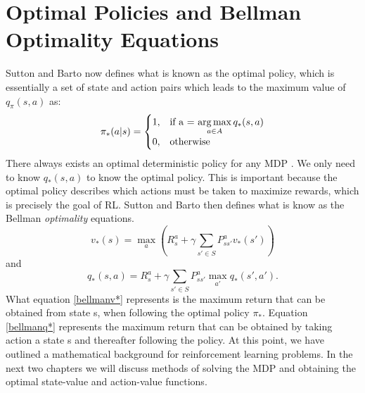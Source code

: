 \section{Optimal Policies and Bellman Optimality Equations}
Sutton and Barto now defines what is known as the optimal policy, which is essentially a set of state and action pairs which leads to the maximum value of $q_\pi(s,a)$ as:
\begin{align}
	\pi_{*}(a|s)=\begin{cases}
		1, & \text{if a = $\operatorname*{arg\,max}\limits_{a \in A}q_* (s,a)$}\\
		0, & \text{otherwise}
	\end{cases}
	\label{eq:pi_*}
\end{align}
There always exists an optimal deterministic policy for any MDP \cite{sutton_barto}. We only need to know $q_* (s,a)$ to know the optimal policy. This is important because the optimal policy describes which actions must be taken to maximize rewards, which is precisely the goal of RL.
Sutton and Barto \cite{sutton_barto} then defines what is know as the Bellman \textit{optimality} equations.
\begin{equation}
	v_*(s) = \max\limits_{a}(R^{a}_s+\gamma\sum_{s'\in S}P^{a}_{ss'}v_*(s'))
	\label{bellmanv*}
\end{equation}
and
\begin{equation}
	q_*(s,a) = R^{a}_s +\gamma \sum_{s'\in S}P^{a}_{ss'}\max\limits_{a'}q_*(s',a').
	\label{bellmanq*}
\end{equation}
What equation \ref{bellmanv*} represents is the maximum return that can be obtained from state s, when following the optimal policy $\pi_*$. Equation \ref{bellmanq*} represents the maximum return that can be obtained by taking action a state s and thereafter following the policy.
At this point, we have outlined a mathematical background for reinforcement learning problems.
In the next two chapters we will discuss methods of solving the MDP and obtaining the optimal state-value and action-value functions. 

